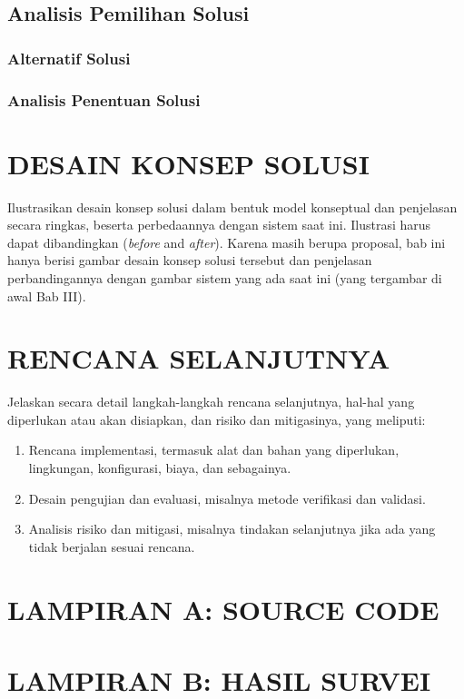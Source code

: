 \documentclass[12pt,a4paper,oneside]{book}
\begin{document}
\section{Analisis Pemilihan Solusi}
\subsection{Alternatif Solusi}
\lipsum[8]
\subsection{Analisis Penentuan Solusi}
\lipsum[9]

\chapter{DESAIN KONSEP SOLUSI}
Ilustrasikan desain konsep solusi dalam bentuk model konseptual dan penjelasan secara ringkas, 
beserta perbedaannya dengan sistem saat ini. Ilustrasi harus dapat dibandingkan (\textit{before} and \textit{after}). 
Karena masih berupa proposal, bab ini hanya berisi gambar desain konsep solusi tersebut dan 
penjelasan perbandingannya dengan gambar sistem yang ada saat ini (yang tergambar di awal Bab III).

\chapter{RENCANA SELANJUTNYA}
Jelaskan secara detail langkah-langkah rencana selanjutnya, hal-hal yang diperlukan atau akan disiapkan, dan risiko dan mitigasinya, yang meliputi:
\begin{enumerate}
\item	Rencana implementasi, termasuk alat dan bahan yang diperlukan, lingkungan, konfigurasi, biaya, dan sebagainya.
\item	Desain pengujian dan evaluasi, misalnya metode verifikasi dan validasi.
\item	Analisis risiko dan mitigasi, misalnya tindakan selanjutnya jika ada yang tidak berjalan sesuai rencana.
\end{enumerate}


\backmatter


\printbibliography[title={DAFTAR PUSTAKA}]

\appendix

\chapter{LAMPIRAN A: SOURCE CODE}

\chapter{LAMPIRAN B: HASIL SURVEI}
\end{document}

